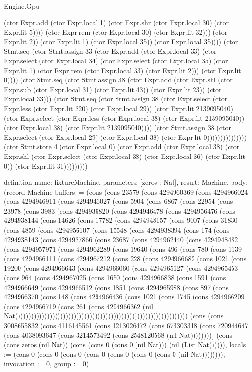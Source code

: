 \begin{lexlean}{Engine.Gpu}
\begin{semanticmodule}
{(ctor Expr.add (ctor Expr.local 1) (ctor Expr.shr (ctor Expr.local 30) (ctor Expr.lit 5)))) (ctor Expr.rem (ctor Expr.local 30) (ctor Expr.lit 32))) (ctor Expr.lit 2)) (ctor Expr.lit 1) (ctor Expr.local 35)) (ctor Expr.local 35)))) (ctor Stmt.seq (ctor Stmt.assign 33 (ctor Expr.add (ctor Expr.local 33) (ctor Expr.select (ctor Expr.local 34) (ctor Expr.select (ctor Expr.local 35) (ctor Expr.lit 1) (ctor Expr.rem (ctor Expr.local 33) (ctor Expr.lit 2))) (ctor Expr.lit 0)))) (ctor Stmt.seq (ctor Stmt.assign 38 (ctor Expr.add (ctor Expr.shl (ctor Expr.sub (ctor Expr.local 31) (ctor Expr.lit 43)) (ctor Expr.lit 23)) (ctor Expr.local 33))) (ctor Stmt.seq (ctor Stmt.assign 38 (ctor Expr.select (ctor Expr.less (ctor Expr.lit 320) (ctor Expr.local 29)) (ctor Expr.lit 2139095040) (ctor Expr.select (ctor Expr.less (ctor Expr.local 38) (ctor Expr.lit 2139095040)) (ctor Expr.local 38) (ctor Expr.lit 2139095040)))) (ctor Stmt.assign 38 (ctor Expr.select (ctor Expr.local 29) (ctor Expr.local 38) (ctor Expr.lit 0))))))))))))))) (ctor Stmt.store 4 (ctor Expr.local 0) (ctor Expr.add (ctor Expr.local 38) (ctor Expr.shl (ctor Expr.select (ctor Expr.local 38) (ctor Expr.local 36) (ctor Expr.lit 0)) (ctor Expr.lit 31)))))))))
}

definition{
  name: fixtureMachine,
  parameters: [zeros : Nat],
  result: Machine,
  body: (record Machine {buffers := (cons (cons 23579 (cons 4294960369 (cons 4294966024 (cons 4294946911 (cons 4294946027 (cons 5904 (cons 6867 (cons 22954 (cons 23978 (cons 3983 (cons 4294936820 (cons 4294946478 (cons 4294956476 (cons 4294938144 (cons 14626 (cons 17782 (cons 4294948157 (cons 9007 (cons 31830 (cons 4859 (cons 4294956107 (cons 15548 (cons 4294938394 (cons 174 (cons 4294938143 (cons 4294937866 (cons 23687 (cons 4294962440 (cons 4294948482 (cons 4294957971 (cons 4294962289 (cons 19640 (cons 496 (cons 780 (cons 1139 (cons 4294966111 (cons 4294967212 (cons 228 (cons 4294966682 (cons 1021 (cons 19200 (cons 4294966643 (cons 4294966060 (cons 4294965627 (cons 4294965453 (cons 964 (cons 4294967025 (cons 1650 (cons 4294966838 (cons 1591 (cons 4294966649 (cons 4294966512 (cons 1851 (cons 4294965988 (cons 897 (cons 4294966370 (cons 148 (cons 4294966436 (cons 1021 (cons 1745 (cons 4294966209 (cons 4294966719 (cons 261 (cons 4294966362 (nil Nat))))))))))))))))))))))))))))))))))))))))))))))))))))))))))))))))) (cons (cons 3008655832 (cons 4116145561 (cons 1213026472 (cons 673303318 (cons 720944647 (cons 4038093647 (cons 3214573492 (cons 2548120568 (nil Nat))))))))) (cons (cons zeros (nil Nat)) (cons (cons 0 (cons 0 (nil Nat))) (nil (List Nat)))))), locals := (cons 0 (cons 0 (cons 0 (cons 0 (cons 0 (cons 0 (cons 0 (nil Nat)))))))), invocation := 0, group := 0})
}


\end{semanticmodule}
\end{lexlean}
